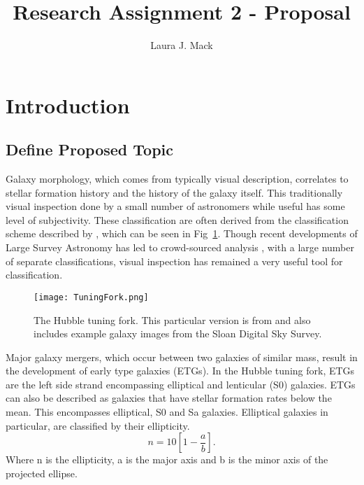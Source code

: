\documentclass[fleqn,usenatbib]{mnras}
\title[Research Assignment 2]{Research Assignment 2 - Proposal}
\author[L. Mack]{
Laura J. Mack
}
\begin{document}
\label{firstpage}
\pagerange{\pageref{firstpage}--\pageref{lastpage}}
\maketitle



\section{Introduction}
\subsection{Define Proposed Topic}
\label{sec:par1}
Galaxy morphology, which comes from typically visual description, correlates to stellar formation history and the history of the galaxy itself. This traditionally visual inspection done by a small number of astronomers while useful has some level of subjectivity. These classification are often derived from the classification scheme described by \citep{Hubble1926}, which can be seen in Fig~\ref{fig:TuningFork}. Though recent developments of Large Survey Astronomy has led to crowd-sourced analysis \citep{Masters2025morphology}, with a large number of separate classifications, visual inspection has remained a very useful tool for classification.\\
\begin{figure}
	\texttt{[image: TuningFork.png]}
    \caption{The Hubble tuning fork. This particular version is from \citet{Masters2025morphology} and also includes example galaxy images from the Sloan Digital Sky Survey. }
    \label{fig:TuningFork}
\end{figure}

Major galaxy mergers, which occur between two galaxies of similar mass, result in the development of early type galaxies (ETGs). In the Hubble tuning fork, ETGs are the left side strand encompassing elliptical and lenticular (S0) galaxies. ETGs can also be described as galaxies that have stellar formation rates below the mean. This encompasses elliptical, S0 and Sa galaxies. Elliptical galaxies in particular, are classified by their ellipticity. 
\begin{equation}
n = 10[1-\frac{a}{b}]. 
\end{equation}
Where n is the ellipticity, a is the major axis and b is the minor axis of the projected ellipse. 
\end{document}
